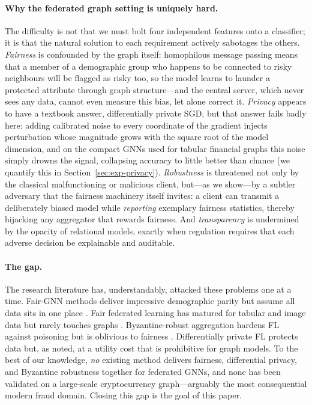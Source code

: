 \documentclass[pdflatex,sn-mathphys-num]{sn-jnl}
\theoremstyle{thmstyleone}%
\theoremstyle{thmstyletwo}%
\theoremstyle{thmstylethree}%
\begin{document}
\paragraph{Why the federated graph setting is uniquely hard.}
The difficulty is not that we must bolt four independent features onto a
classifier; it is that the natural solution to each requirement actively
sabotages the others. \emph{Fairness} is confounded by the graph itself:
homophilous message passing means that a member of a demographic group who
happens to be connected to risky neighbours will be flagged as risky too, so the
model learns to launder a protected attribute through graph structure---and the
central server, which never sees any data, cannot even measure this bias, let
alone correct it. \emph{Privacy} appears to have a textbook answer,
differentially private SGD, but that answer fails badly here: adding calibrated
noise to every coordinate of the gradient injects perturbation whose magnitude
grows with the square root of the model dimension, and on the compact GNNs used
for tabular financial graphs this noise simply drowns the signal, collapsing
accuracy to little better than chance (we quantify this in
Section~\ref{sec:exp-privacy}). \emph{Robustness} is threatened not only by the
classical malfunctioning or malicious client, but---as we show---by a subtler
adversary that the fairness machinery itself invites: a client can transmit a
deliberately biased model while \emph{reporting} exemplary fairness statistics,
thereby hijacking any aggregator that rewards fairness. And \emph{transparency}
is undermined by the opacity of relational models, exactly when regulation
requires that each adverse decision be explainable and auditable.

\paragraph{The gap.}
The research literature has, understandably, attacked these problems one at a
time. Fair-GNN methods deliver impressive demographic parity but assume all data
sits in one place \cite{dai2021say,yang2024fairsin,lee2025dabgnn}. Fair federated
learning has matured for tabular and image data but rarely touches graphs
\cite{ezzeldin2023fairfed,li2020fair}. Byzantine-robust aggregation hardens FL
against poisoning but is oblivious to fairness \cite{blanchard2017krum,
yin2018byzantine}. Differentially private FL protects data but, as noted, at a
utility cost that is prohibitive for graph models. To the best of our knowledge,
\emph{no} existing method delivers fairness, differential privacy, and Byzantine
robustness together for federated GNNs, and none has been validated on a
large-scale cryptocurrency graph---arguably the most consequential modern fraud
domain. Closing this gap is the goal of this paper.
\end{document}
